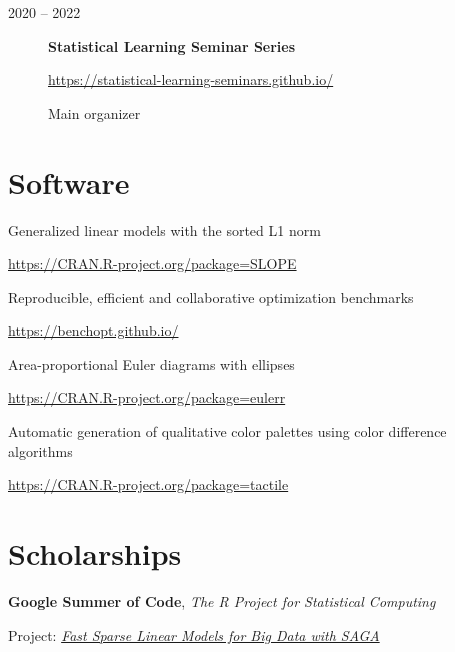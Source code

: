 \documentclass[english,a4paper]{article}
\renewcommand*{%
  \mkbibnamegiven
}[1]{\ifitemannotation{highlight}{\textbf{#1}}{#1}}
\renewcommand*{%
  \mkbibnamefamily
}[1]{\ifitemannotation{highlight}{\textbf{#1}}{#1}}
\begin{document}
\begin{description}
  \item[2020 -- 2022]{
              \textbf{Statistical Learning Seminar Series}

              \url{https://statistical-learning-seminars.github.io/}

              Main organizer
        }
\end{description}

\section{Software}

\begin{description}[
    labelwidth = \widthof{qualpalr} + 1em,
    leftmargin = \widthof{qualpalr} + 1em,
  ]
  \item[SLOPE] {
    Generalized linear models with the sorted L1 norm

    \url{https://CRAN.R-project.org/package=SLOPE}
    }

    \item[benchopt]{
                Reproducible, efficient and collaborative optimization benchmarks

                \url{https://benchopt.github.io/}
          }

    \item[eulerr]{
                Area-proportional Euler diagrams with ellipses

                \url{https://CRAN.R-project.org/package=eulerr}
          }

  \item[qualpalr] {
    Automatic generation of qualitative color palettes using color difference
    algorithms

    \url{https://CRAN.R-project.org/package=tactile}
    }

\end{description}

\section{Scholarships}
\begin{description}[
    labelwidth = \widthof{2018} + 1em,
    leftmargin = \widthof{2018} + 1em,
  ]

  \item[2018]{
              \textbf{Google Summer of Code}, \emph{The R Project for Statistical Computing}

              Project: \emph{\href{https://summerofcode.withgoogle.com/archive/2018/projects/6276491595743232/}{Fast Sparse Linear Models for Big Data with SAGA}}
        }
\end{description}
\end{document}
